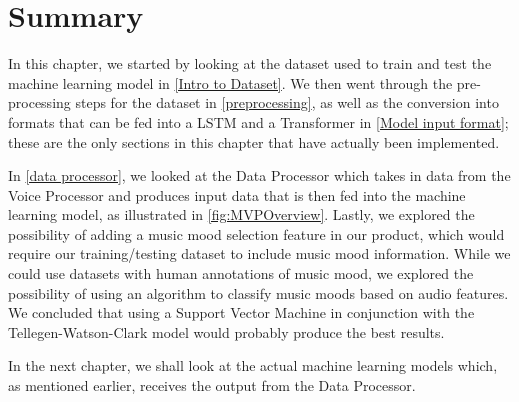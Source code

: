 \section{Summary}

In this chapter, we started by looking at the dataset used to train and test the machine learning model in \cref{Intro to Dataset}. We then went through the pre-processing steps for the dataset in \cref{preprocessing}, as well as the conversion into formats that can be fed into a LSTM and a Transformer in \cref{Model input format}; these are the only sections in this chapter that have actually been implemented. 

In \cref{data processor}, we looked at the Data Processor which takes in data from the Voice Processor and produces input data that is then fed into the machine learning model, as illustrated in \cref{fig:MVPOverview}. Lastly, we explored the possibility of adding a music mood selection feature in our product, which would require our training/testing dataset to include music mood information. While we could use datasets with human annotations of music mood, we explored the possibility of using an algorithm to classify music moods based on audio features. We concluded that using a Support Vector Machine in conjunction with the Tellegen-Watson-Clark model would probably produce the best results.

In the next chapter, we shall look at the actual machine learning models which, as mentioned earlier, receives the output from the Data Processor.